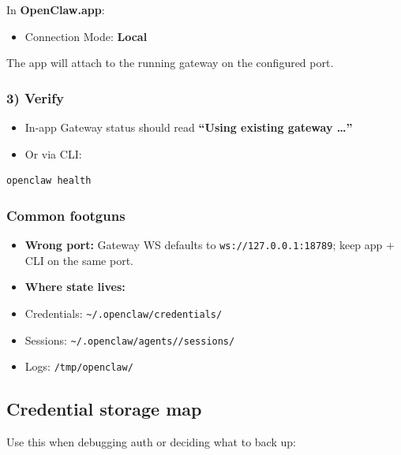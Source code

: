In \textbf{OpenClaw.app}:

\begin{itemize}
  \item Connection Mode: \textbf{Local}
\end{itemize}

The app will attach to the running gateway on the configured port.

\subsubsection{3) Verify}


\begin{itemize}
  \item In-app Gateway status should read \textbf{“Using existing gateway …”}
  \item Or via CLI:
\end{itemize}


\begin{lstlisting}[language=bash]
openclaw health
\end{lstlisting}


\subsubsection{Common footguns}


\begin{itemize}
  \item \textbf{Wrong port:} Gateway WS defaults to \texttt{ws://127.0.0.1:18789}; keep app + CLI on the same port.
  \item \textbf{Where state lives:}
  \item Credentials: \texttt{\textasciitilde{}/.openclaw/credentials/}
  \item Sessions: \texttt{\textasciitilde{}/.openclaw/agents//sessions/}
  \item Logs: \texttt{/tmp/openclaw/}
\end{itemize}


\subsection{Credential storage map}


Use this when debugging auth or deciding what to back up:


